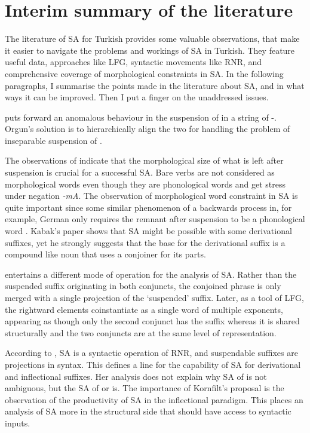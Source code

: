 \section{Interim summary of the literature}

The literature of SA for Turkish provides some valuable observations, that make it easier to navigate the problems and workings of SA in Turkish. They feature useful data, approaches like LFG, syntactic movements like RNR, and comprehensive coverage of morphological constraints in SA. In the following paragraphs, I summarise the points made in the literature about SA, and in what ways it can be improved. Then I put a finger on the unaddressed issues.

\citet{orgun1995flat} puts forward an anomalous behaviour in the suspension of {\Poss} in a string of {\Pl-\Poss}. Orgun's solution is to hierarchically align the two for handling the problem of inseparable suspension of {\Poss}.

The observations of \citet{kabak2007turkish} indicate that the morphological size of what is left after suspension is crucial for a successful SA. Bare verbs are not considered as morphological words even though they are phonological words and get stress under negation \textit{-mA}. The observation of morphological word constraint in SA is quite important since some similar phenomenon of a backwards process in, for example, German only requires the remnant after suspension to be a phonological word \citep{smith2000word, pounder2006broken,kenesei2007semiwords}. Kabak's paper shows that SA might be possible with some derivational suffixes, yet he strongly suggests that the base for the derivational suffix is a compound like noun that uses a conjoiner for its parts.

\citet{broadwell2008turkish} entertains a different mode of operation for the analysis of SA. Rather than the suspended suffix originating in both conjuncts, the conjoined phrase is only merged with a single projection of the `suspended' suffix. Later, as a tool of LFG, the rightward elements coinstantiate as a single word of multiple exponents, appearing as though only the second conjunct has the suffix whereas it is shared structurally and the two conjuncts are at the same level of representation.

According to \citet{kornfilt1996some, kornfilt2012revisiting}, SA is a syntactic operation of RNR, and suspendable suffixes are projections in syntax. This defines a line for the capability of SA for derivational and inflectional suffixes. Her analysis does not explain why SA of {\Case} is not ambiguous, but the SA of {\Pl} or {\Poss} is. The importance of Kornfilt's proposal is the observation of the productivity of SA in the inflectional paradigm. This places an analysis of SA more in the structural side that should have access to syntactic inputs.

